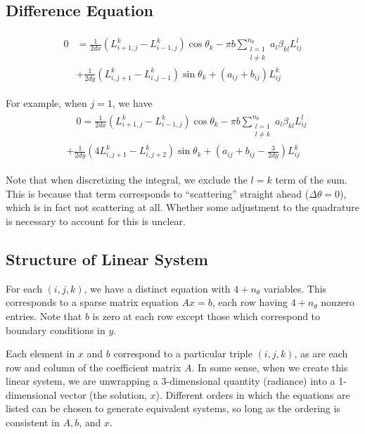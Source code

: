 \subsection{Difference Equation}
\begin{align}
    \label{eq:diffeq}
    \begin{split}
    0 &= \frac{1}{2dx}\left(L_{i+1,j}^k - L_{i-1,j}^k\right) \cos\theta_k
    - \pi b \sum_{\substack{l=1\\ l\neq k}}^{n_\theta} a_l\beta_{kl}L_{ij}^l \\
    &+ \frac{1}{2dy}\left(L_{i,j+1}^k - L_{i,j-1}^k\right) \sin\theta_k
    + (a_{ij} + b_{ij})L_{ij}^k
    \end{split}
\end{align}

For example, when $j=1$, we have
\begin{align}
    \label{eq:diffeq_bc}
    \begin{split}
    &\quad0 = \frac{1}{2dx}\left(L_{i+1,j}^k - L_{i-1,j}^k\right) \cos\theta_k
    - \pi b \sum_{\substack{l=1\\ l\neq k}}^{n_\theta} a_l\beta_{kl}L_{ij}^l \\
	&+ \frac{1}{2dy}\left(4L_{i,j+1}^k - L_{i,j+2}^k\right) \sin\theta_k
	+ (a_{ij} + b_{ij} -\frac{3}{2dy})L_{ij}^k
    \end{split}
\end{align}

Note that when discretizing the integral, we exclude the $l=k$ term of the sum.
This is because that term corresponds to ``scattering'' straight ahead ($\Delta\theta=0$), which is in fact not scattering at all.
Whether some adjustment to the quadrature is necessary to account for this is unclear.

\subsection{Structure of Linear System}
For each $(i,j,k)$, we have a distinct equation with $4+n_\theta$ variables.
This corresponds to a sparse matrix equation $Ax=b$, each row having $4+n_\theta$ nonzero entries.
Note that $b$ is zero at each row except those which correspond to boundary conditions in $y$.

Each element in $x$ and $b$ correspond to a particular triple $(i,j,k)$, as are each row and column of the coefficient matrix $A$.
In some sense, when we create this linear system, we are unwrapping a 3-dimensional quantity (radiance) into a 1-dimensional vector (the solution, $x$).
Different orders in which the equations are listed can be chosen to generate equivalent systems, so long as the ordering is consistent in $A,b$, and $x$.

